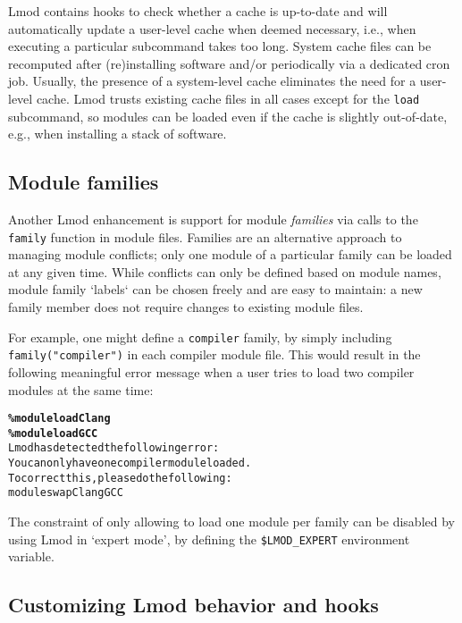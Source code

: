 Lmod contains hooks to check whether a cache is up-to-date and will automatically
update a user-level cache when deemed necessary, i.e., when executing a particular
subcommand takes too long. System cache files can be recomputed after (re)installing 
software and/or periodically via a dedicated cron job. Usually, the presence of a
system-level cache eliminates the need for a user-level cache. Lmod trusts existing
cache files in all cases except for the \texttt{\small load} subcommand, so
modules can be loaded even if the cache is slightly out-of-date,
e.g., when installing a stack of software.


\subsection{Module families}

Another Lmod enhancement is support for module
\emph{families} via calls to the \texttt{\small family} function in module files.
Families are an alternative approach to managing module conflicts; only one module of
a particular family can be loaded at any given time. While conflicts can only be
defined based on module names, module family `labels` can be chosen freely and
are easy to maintain: a new family member does not require changes to existing
module files.

For example, one might define a \texttt{\small compiler} family, by
simply including \texttt{\small family("compiler")} in each compiler module file.
This would result in the following meaningful error message when a user tries to
load two compiler modules at the same time:

{\small
\begin{alltt}
  \textbf{\% module load Clang}
  \textbf{\% module load GCC}
  Lmod has detected the following error:
  You can only have one compiler module loaded.
  To correct this, please do the following:
      module swap Clang GCC\
\end{alltt}}
\noindent
The constraint of only allowing to load one module per family can be
disabled by using Lmod in `expert mode', by defining the
\texttt{\small \$LMOD\_EXPERT} environment variable.

\subsection{Customizing Lmod behavior and hooks}

